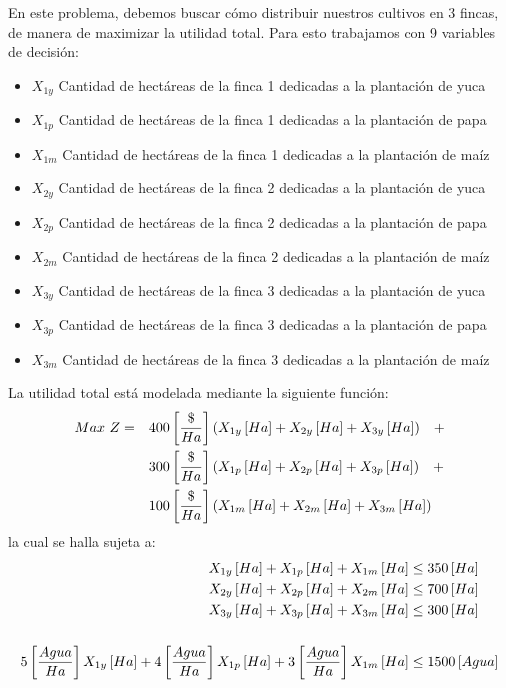 \documentclass{tarea}
\begin{document}
\begin{homeworkProblem}[-1][Agropecuario]
En este problema, debemos buscar cómo distribuir nuestros cultivos en 3 fincas, de manera
de maximizar la utilidad total. Para esto trabajamos con 9 variables de decisión:
\begin{itemize}
\item $X_{1y}$ Cantidad de hectáreas de la finca 1 dedicadas a la plantación de yuca
\item $X_{1p}$ Cantidad de hectáreas de la finca 1 dedicadas a la plantación de papa
\item $X_{1m}$ Cantidad de hectáreas de la finca 1 dedicadas a la plantación de maíz
\item $X_{2y}$ Cantidad de hectáreas de la finca 2 dedicadas a la plantación de yuca
\item $X_{2p}$ Cantidad de hectáreas de la finca 2 dedicadas a la plantación de papa
\item $X_{2m}$ Cantidad de hectáreas de la finca 2 dedicadas a la plantación de maíz
\item $X_{3y}$ Cantidad de hectáreas de la finca 3 dedicadas a la plantación de yuca
\item $X_{3p}$ Cantidad de hectáreas de la finca 3 dedicadas a la plantación de papa
\item $X_{3m}$ Cantidad de hectáreas de la finca 3 dedicadas a la plantación de maíz
\end{itemize}
La utilidad total está modelada mediante la siguiente función:
\begin{align*}
Max\ Z =\quad &400\left[ \frac{\$}{Ha} \right](X_{1y}\left[ Ha \right]+X_{2y}\left[ Ha \right]+X_{3y}\left[ Ha \right])\quad + \\
  &300\left[ \frac{\$}{Ha} \right](X_{1p}\left[ Ha \right]+X_{2p}\left[ Ha \right]+X_{3p}\left[ Ha \right])\quad + \\
    &100\left[ \frac{\$}{Ha} \right](X_{1m}\left[ Ha \right]+X_{2m}\left[ Ha \right]+X_{3m}\left[ Ha \right])
\end{align*}
la cual se halla sujeta a:
\begin{align*}
X_{1y}\corche{Ha} + X_{1p}\corche{Ha} + X_{1m}\corche{Ha} &\le 350\corche{Ha} \\
X_{2y}\corche{Ha} + X_{2p}\corche{Ha} + X_{2m}\corche{Ha} &\le 700\corche{Ha} \\
X_{3y}\corche{Ha} + X_{3p}\corche{Ha} + X_{3m}\corche{Ha} &\le 300\corche{Ha} \\
\\
5\fraccorche{Agua}{Ha}X_{1y}\corche{Ha} + 4\fraccorche{Agua}{Ha}X_{1p}\corche{Ha} + 3\fraccorche{Agua}{Ha}X_{1m}\corche{Ha} &\le 1500\corche{Agua} \\

\end{align*}
\end{homeworkProblem}
\end{document}
